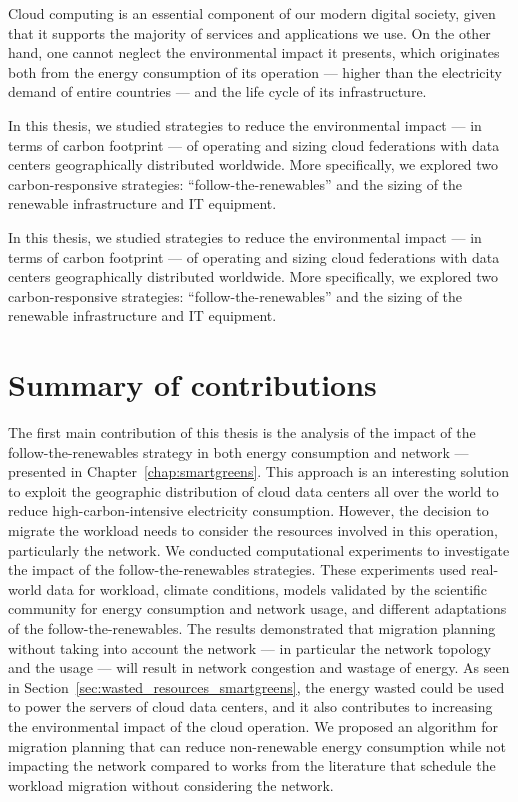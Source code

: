 Cloud computing is an essential component of our modern digital society, given that it supports the majority of services and applications we use. On the other hand, one cannot neglect the environmental impact it presents, which originates both from the energy consumption of its operation --- higher than the electricity demand of entire countries --- and the life cycle of its infrastructure.

In this thesis, we studied strategies to reduce the environmental impact --- in terms of carbon footprint --- of operating and sizing cloud federations with data centers geographically distributed worldwide. More specifically, we explored two carbon-responsive strategies: ``follow-the-renewables'' and the sizing of the renewable infrastructure and IT equipment.

In this thesis, we studied strategies to reduce the environmental impact --- in terms of carbon footprint --- of operating and sizing cloud federations with data centers geographically distributed worldwide. More specifically, we explored two carbon-responsive strategies: ``follow-the-renewables'' and the sizing of the renewable infrastructure and IT equipment.


\section{Summary of contributions }

\label{sec:conclusion_summary}

The first main contribution of this thesis is the analysis of the impact of the follow-the-renewables strategy in both energy consumption and network --- presented in Chapter~\ref{chap:smartgreens}. This approach is an interesting solution to exploit the geographic distribution of cloud data centers all over the world to reduce high-carbon-intensive electricity consumption. However, the decision to migrate the workload needs to consider the resources involved in this operation, particularly the network. We conducted computational experiments to investigate the impact of the follow-the-renewables strategies. These experiments used real-world data for workload, climate conditions, models validated by the scientific community for energy consumption and network usage, and different adaptations of the follow-the-renewables. The results demonstrated that migration planning without taking into account the network --- in particular the network topology and the usage --- will result in network congestion and wastage of energy. As seen in Section~\ref{sec:wasted_resources_smartgreens}, the energy wasted could be used to power the servers of cloud data centers, and it also contributes to increasing the environmental impact of the cloud operation. We proposed an algorithm for migration planning that can reduce non-renewable energy consumption while not impacting the network compared to works from the literature that schedule the workload migration without considering the network.


